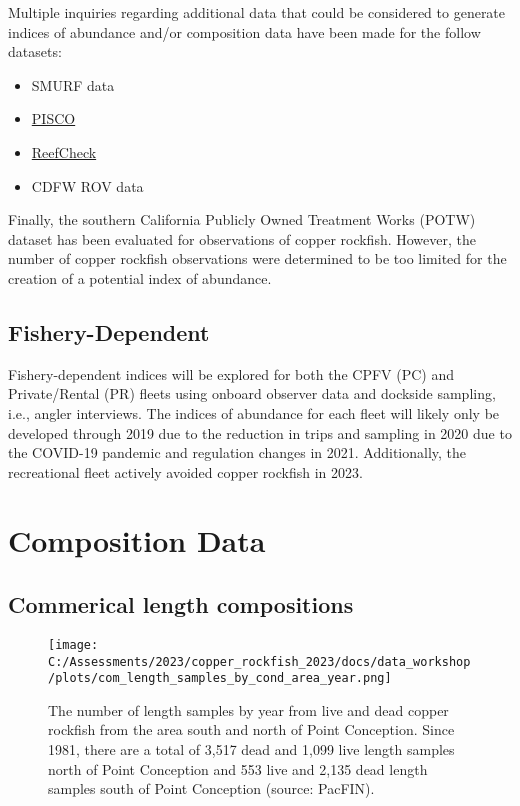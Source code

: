 \documentclass[
]{article}
\providecommand{\tightlist}{%
  \setlength{\itemsep}{0pt}\setlength{\parskip}{0pt}}
\begin{document}
Multiple inquiries regarding additional data that could be considered to
generate indices of abundance and/or composition data have been made for
the follow datasets:

\begin{itemize}
\tightlist
\item
  SMURF data
\item
  \href{https://www.piscoweb.org/}{PISCO}
\item
  \href{https://www.reefcheck.org/country/usa-california/}{ReefCheck}
\item
  CDFW ROV data
\end{itemize}

Finally, the southern California Publicly Owned Treatment Works (POTW)
dataset has been evaluated for observations of copper rockfish. However,
the number of copper rockfish observations were determined to be too
limited for the creation of a potential index of abundance.

\hypertarget{fishery-dependent}{%
\subsection{Fishery-Dependent}\label{fishery-dependent}}

Fishery-dependent indices will be explored for both the CPFV (PC) and
Private/Rental (PR) fleets using onboard observer data and dockside
sampling, i.e., angler interviews. The indices of abundance for each
fleet will likely only be developed through 2019 due to the reduction in
trips and sampling in 2020 due to the COVID-19 pandemic and regulation
changes in 2021. Additionally, the recreational fleet actively avoided
copper rockfish in 2023.

\hypertarget{composition-data}{%
\section{Composition Data}\label{composition-data}}

\hypertarget{commerical-length-compositions}{%
\subsection{Commerical length
compositions}\label{commerical-length-compositions}}

\begin{figure}
\centering
\texttt{[image: C:/Assessments/2023/copper\_rockfish\_2023/docs/data\_workshop/plots/com\_length\_samples\_by\_cond\_area\_year.png]}
\caption{The number of length samples by year from live and dead copper
rockfish from the area south and north of Point Conception. Since 1981,
there are a total of 3,517 dead and 1,099 live length samples north of
Point Conception and 553 live and 2,135 dead length samples south of
Point Conception (source: PacFIN).\label{fig:com-length-n}}
\end{figure}
\end{document}
